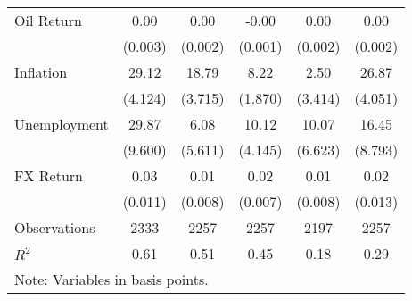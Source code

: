 \begin{table}[htbp]
\begin{tabular*}{0.8\hsize}{@{\hskip\tabcolsep\extracolsep\fill}l*{5}{c}}
\addlinespace
Oil Return          &        0.00         &        0.00         &       -0.00         &        0.00         &        0.00         \\
                    &     (0.003)         &     (0.002)         &     (0.001)         &     (0.002)         &     (0.002)         \\
\addlinespace
Inflation           &       29.12\sym{***}&       18.79\sym{***}&        8.22\sym{***}&        2.50         &       26.87\sym{***}\\
                    &     (4.124)         &     (3.715)         &     (1.870)         &     (3.414)         &     (4.051)         \\
\addlinespace
Unemployment        &       29.87\sym{**} &        6.08         &       10.12\sym{*}  &       10.07         &       16.45         \\
                    &     (9.600)         &     (5.611)         &     (4.145)         &     (6.623)         &     (8.793)         \\
\addlinespace
FX Return           &        0.03\sym{**} &        0.01         &        0.02\sym{*}  &        0.01         &        0.02         \\
                    &     (0.011)         &     (0.008)         &     (0.007)         &     (0.008)         &     (0.013)         \\
\midrule
Observations        &        2333         &        2257         &        2257         &        2197         &        2257         \\
\(R^{2}\)           &        0.61         &        0.51         &        0.45         &        0.18         &        0.29         \\
\bottomrule
\multicolumn{6}{l}{\footnotesize Note: Variables in basis points.}\\
\end{tabular*}
\end{table}
